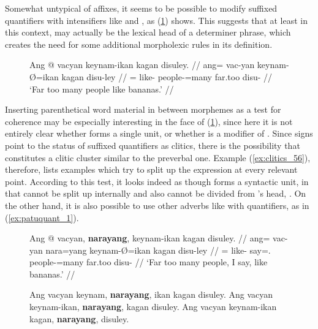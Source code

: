Somewhat untypical of affixes, it seems to be possible to modify suffixed
quantifiers with intensifiers like  and
, as (\ref{ex:clitics_55}) shows. This suggests
that at least in this context,  may
actually be the lexical head of a determiner phrase, which creates the need for
some additional morpholexic rules in its definition.

\begin{figure}[h]
\ex\label{ex:clitics_55}\begingl
	\gla Ang @ vacyan keynam-ikan kagan disuley. //
	\glb ang= vac-yan keynam-Ø=ikan kagan disu-ley //
	\glc \AgtT{}= like-\TplM{} people-\Top{}=many far.too disu-\PargI{} //
	\glft `Far too many people like bananas.' //
\endgl\xe
\end{figure}

Inserting parenthetical word material in between morphemes as a test for
coherence may be especially interesting in the face of (\ref{ex:clitics_55}),
since here it is not entirely clear whether  forms a single unit, or whether  is a modifier of . Since signs
point to the status of suffixed quantifiers as clitics, there is the
possibility that  constitutes a
clitic cluster similar to the preverbal one. Example (\ref{ex:clitics_56}),
therefore, lists examples which try to split up the expression at every
relevant point. According to this test, it looks indeed as though
 forms a syntactic unit, in that 
 cannot be split up internally and also cannot be
divided from 's head, . On the
other hand, it is also possible to use other adverbs like
 with quantifiers, as in (\ref{ex:patuquant_1}).

\begin{figure}[h]
\pex\label{ex:clitics_56}
\a\label{ex:clitics_56a}\begingl
	\gla Ang @ vacyan, \textbf{narayang}, keynam-ikan kagan disuley. //
	\glb ang= vac-yan nara=yang keynam-Ø=ikan kagan disu-ley //
	\glc \AgtT{}= like-\TplM{} say=\Fsg{}.\Aarg{} people-\Top{}=many far.too
		disu-\PargI{} //
	\glft `Far too many people, I say, like bananas.' //
\endgl

\a\label{ex:clitics_56b}
	\ljudge{*} Ang vacyan keynam, \textbf{narayang}, ikan kagan disuley.
\a\label{ex:clitics_56c}
	\ljudge{*} Ang vacyan keynam-ikan, \textbf{narayang}, kagan disuley.
\a\label{ex:clitics_56d}
	Ang vacyan keynam-ikan kagan, \textbf{narayang}, disuley.
\xe
\end{figure}

